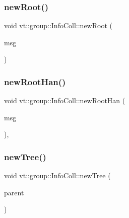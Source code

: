 \subsubsection{\texorpdfstring{new\+Root()}{newRoot()}}
{\footnotesize\ttfamily void vt\+::group\+::\+Info\+Coll\+::new\+Root (\begin{DoxyParamCaption}\item[{\hyperlink{namespacevt_1_1group_a4c1183efe0185992fefb3ab38a55a8a7}{Group\+Collective\+Msg} $\ast$}]{msg }\end{DoxyParamCaption})\hspace{0.3cm}{\ttfamily [private]}}

\mbox{\label{structvt_1_1group_1_1_info_coll_a1c37f69107e014a3aef10346e5ebe0c7}} 
\subsubsection{\texorpdfstring{new\+Root\+Han()}{newRootHan()}}
{\footnotesize\ttfamily void vt\+::group\+::\+Info\+Coll\+::new\+Root\+Han (\begin{DoxyParamCaption}\item[{\hyperlink{namespacevt_1_1group_a4c1183efe0185992fefb3ab38a55a8a7}{Group\+Collective\+Msg} $\ast$}]{msg }\end{DoxyParamCaption})\hspace{0.3cm}{\ttfamily [static]}, {\ttfamily [protected]}}

\mbox{\label{structvt_1_1group_1_1_info_coll_aea685940e7c9f1e18d55bfab07e31445}} 
\subsubsection{\texorpdfstring{new\+Tree()}{newTree()}}
{\footnotesize\ttfamily void vt\+::group\+::\+Info\+Coll\+::new\+Tree (\begin{DoxyParamCaption}\item[{\hyperlink{namespacevt_a866da9d0efc19c0a1ce79e9e492f47e2}{Node\+Type} const \&}]{parent }\end{DoxyParamCaption})\hspace{0.3cm}{\ttfamily [private]}}

